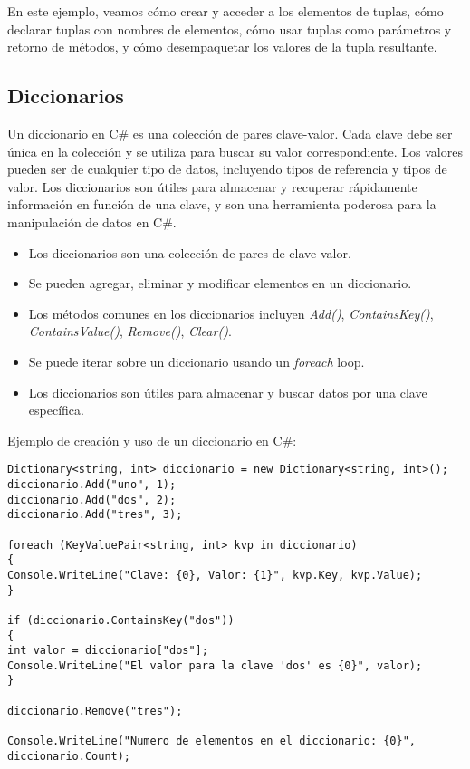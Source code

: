 \documentclass[executivepaper]{article}
\begin{document}
En este ejemplo, veamos cómo crear y acceder a los elementos de tuplas, cómo declarar tuplas con nombres de elementos, cómo usar tuplas como parámetros y retorno de métodos, y cómo desempaquetar los valores de la tupla resultante.

\subsection{Diccionarios}

Un diccionario en C\# es una colección de pares clave-valor. Cada clave debe ser única en la colección y se utiliza para buscar su valor correspondiente. Los valores pueden ser de cualquier tipo de datos, incluyendo tipos de referencia y tipos de valor. Los diccionarios son útiles para almacenar y recuperar rápidamente información en función de una clave, y son una herramienta poderosa para la manipulación de datos en C\#.
\begin{itemize}
    \item Los diccionarios son una colección de pares de clave-valor.
    \item Se pueden agregar, eliminar y modificar elementos en un diccionario.
    \item Los métodos comunes en los diccionarios incluyen \emph{Add()}, \emph{ContainsKey()}, \emph{ContainsValue()}, \emph{Remove()}, \emph{Clear()}.
    \item Se puede iterar sobre un diccionario usando un \emph{foreach} loop.
    \item Los diccionarios son útiles para almacenar y buscar datos por una clave específica.
\end{itemize}

Ejemplo de creación y uso de un diccionario en C\#:
\begin{lstlisting}
Dictionary<string, int> diccionario = new Dictionary<string, int>();
diccionario.Add("uno", 1);
diccionario.Add("dos", 2);
diccionario.Add("tres", 3);

foreach (KeyValuePair<string, int> kvp in diccionario)
{
Console.WriteLine("Clave: {0}, Valor: {1}", kvp.Key, kvp.Value);
}

if (diccionario.ContainsKey("dos"))
{
int valor = diccionario["dos"];
Console.WriteLine("El valor para la clave 'dos' es {0}", valor);
}

diccionario.Remove("tres");

Console.WriteLine("Numero de elementos en el diccionario: {0}", diccionario.Count);
\end{lstlisting}
\end{document}
